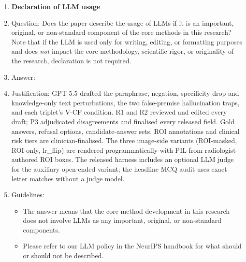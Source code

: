 \begin{enumerate}
\item {\bf Declaration of LLM usage}
    \item[] Question: Does the paper describe the usage of LLMs if it is an important, original, or non-standard component of the core methods in this research? Note that if the LLM is used only for writing, editing, or formatting purposes and does \emph{not} impact the core methodology, scientific rigor, or originality of the research, declaration is not required.
    \item[] Answer: \answerYes{}
    \item[] Justification: GPT-5.5 drafted the paraphrase, negation, specificity-drop and knowledge-only text perturbations, the two false-premise hallucination traps, and each triplet's V-CF condition. \textsc{R1} and \textsc{R2} reviewed and edited every draft; \textsc{P3} adjudicated disagreements and finalised every released field. Gold answers, refusal options, candidate-answer sets, ROI annotations and clinical risk tiers are clinician-finalised. The three image-side variants (ROI-masked, ROI-only, lr\_flip) are rendered programmatically with PIL from radiologist-authored ROI boxes. The released harness includes an optional LLM judge for the auxiliary open-ended variant; the headline MCQ audit uses exact letter matches without a judge model.
    \item[] Guidelines:
    \begin{itemize}
        \item The answer \answerNA{} means that the core method development in this research does not involve LLMs as any important, original, or non-standard components.
        \item Please refer to our LLM policy in the NeurIPS handbook for what should or should not be described.
    \end{itemize}

\end{enumerate}
